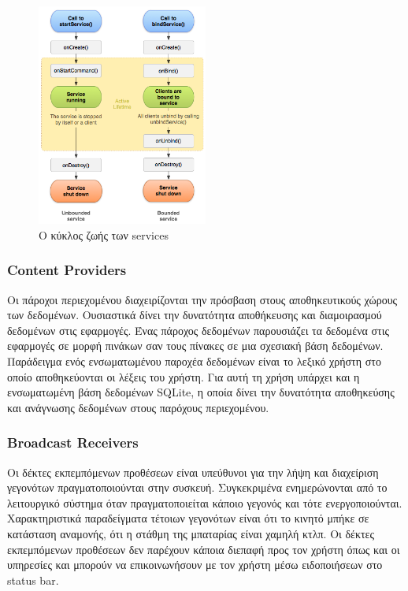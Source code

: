 		\begin{figure}[h]
			\centering
			\includegraphics[width=0.5\textwidth]{service_lifecycle.png}
			\caption{Ο κύκλος ζωής των services}
			\label{fig:service_lifecycle}
		\end{figure}
		
		\subsubsection{Content Providers}
		Οι πάροχοι περιεχομένου διαχειρίζονται την πρόσβαση στους αποθηκευτικούς χώρους των δεδομένων. Ουσιαστικά δίνει την δυνατότητα αποθήκευσης και διαμοιρασμού δεδομένων στις εφαρμογές. Ένας πάροχος δεδομένων παρουσιάζει τα δεδομένα στις εφαρμογές σε μορφή πινάκων σαν τους πίνακες σε μια σχεσιακή βάση δεδομένων. Παράδειγμα ενός ενσωματωμένου παροχέα δεδομένων είναι το λεξικό χρήστη στο οποίο αποθηκεύονται οι λέξεις του χρήστη. Για αυτή τη χρήση υπάρχει και η ενσωματωμένη βάση δεδομένων SQLite, η οποία δίνει την δυνατότητα αποθηκεύσης και ανάγνωσης δεδομένων στους παρόχους περιεχομένου.\cite{androidContentProviders}
		\subsubsection{Broadcast Receivers}
		Οι δέκτες εκπεμπόμενων προθέσεων είναι υπεύθυνοι για την λήψη και διαχείριση γεγονότων πραγματοποιούνται στην συσκευή. Συγκεκριμένα ενημερώνονται από το λειτουργικό σύστημα όταν πραγματοποιείται κάποιο γεγονός και τότε ενεργοποιούνται. Χαρακτηριστικά παραδείγματα τέτοιων γεγονότων είναι ότι το κινητό μπήκε σε κατάσταση αναμονής, ότι η στάθμη της μπαταρίας είναι χαμηλή κτλπ. Οι δέκτες εκπεμπόμενων προθέσεων δεν παρέχουν κάποια διεπαφή προς τον χρήστη όπως και οι υπηρεσίες και μπορούν να επικοινωνήσουν με τον χρήστη μέσω ειδοποιήσεων στο status bar.\cite{broadcastReceiver}


